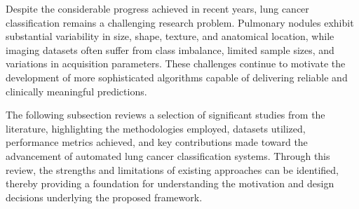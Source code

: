 Despite the considerable progress achieved in recent years, lung cancer classification remains a challenging research problem. Pulmonary nodules exhibit substantial variability in size, shape, texture, and anatomical location, while imaging datasets often suffer from class imbalance, limited sample sizes, and variations in acquisition parameters. These challenges continue to motivate the development of more sophisticated algorithms capable of delivering reliable and clinically meaningful predictions.

The following subsection reviews a selection of significant studies from the literature, highlighting the methodologies employed, datasets utilized, performance metrics achieved, and key contributions made toward the advancement of automated lung cancer classification systems. Through this review, the strengths and limitations of existing approaches can be identified, thereby providing a foundation for understanding the motivation and design decisions underlying the proposed framework.

